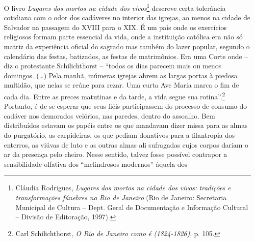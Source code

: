 O livro \emph{Lugares dos mortos na cidade dos vivos}\footnote{Cláudia
  Rodrigues, \emph{Lugares dos mortos na cidade dos vivos: tradições e
  transformações fúnebres no Rio de Janeiro} (Rio de Janeiro: Secretaria
  Municipal de Cultura -- Dept. Geral de Documentação e Informação
  Cultural -- Divisão de Editoração, 1997).} descreve certa tolerância
cotidiana com o odor dos cadáveres no interior das igrejas, ao menos na
cidade de Salvador na passagem do XVIII para o XIX. É um país onde os
exercícios religiosos formam parte essencial da vida, onde a instituição
católica era não só matriz da experiência oficial do sagrado mas também
do lazer popular, segundo o calendário das festas, batizados, as festas
de matrimônios. Era uma Corte onde -- diz o protestante Schilichthorst
-- ``todos os dias parecem mais ou menos domingos. (\ldots{}) Pela
manhã, inúmeras igrejas abrem as largas portas à piedosa multidão, que
nelas se reúne para rezar. Uma curta Ave Maria marca o fim de cada dia.
Entre as preces matutinas e da tarde, a vida segue sua
rotina''.\footnote{Carl Schilichthorst, \emph{O Rio de Janeiro como é
  (1824-1826)}, p. 105.} Portanto, é de se esperar que seus fiéis
participassem do processo de consumo do cadáver nos demorados velórios,
nas paredes, dentro do assoalho. Bem distribuídos estavam os papéis
entre os que mandavam dizer missa para as almas do purgatório, as
carpideiras, os que pediam donativos para a filantropia dos enterros, as
viúvas de luto e as outras almas ali sufragadas cujos corpos dariam o ar
da presença pelo cheiro. Nesse sentido, talvez fosse possível contrapor
a sensibilidade olfativa dos ``melindrosos modernos'' àquela dos
